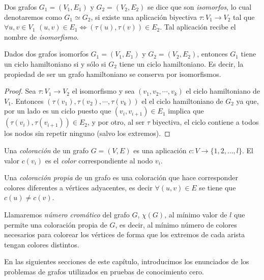 \begin{definition}
	Dos grafos $G_1 = (V_1, E_1)$ y $G_2 = (V_2, E_2)$ se dice que son \textit{isomorfos},
	lo cual denotaremos como $G_1 \simeq G_2$, si existe una aplicación biyectiva
	$\tau : V_1 \rightarrow V_2$ tal que $\forall u,v \in V_1$
	$(u,v) \in E_1 \Leftrightarrow (\tau(u), \tau(v)) \in E_2 $.
	Tal aplicación recibe el nombre de \textit{isomorfismo}.
\end{definition}

\begin{proposition}
Dados dos grafos isomorfos $G_1 = (V_1,E_1)$ y $G_2 = (V_2,E_2)$, entonces $G_1$
tiene un ciclo hamiltoniano si y s\'olo si $G_2$ tiene un ciclo hamiltoniano. Es
decir, la propiedad de ser un grafo hamiltoniano se conserva por isomorfismos.
\end{proposition}
\begin{proof}
Sea $\tau : V_1 \to V_2$ el isomorfismo y sea $(v_1,v_2,\cdots,v_k)$ el ciclo
hamiltoniano de $V_1$. Entonces $(\tau(v_1),\tau(v_2),\cdots,\tau(v_k))$ el el
ciclo hamiltoniano de $G_2$ ya que, por un lado es un ciclo puesto que
$(v_i,v_{i+1}) \in E_1$ implica que $(\tau(v_i),\tau(v_{i+1}))\in E_2$,
y por otro, al ser $\tau$ biyectiva, el ciclo contiene a todos los nodos
sin repetir ninguno (salvo los extremos).
\end{proof}

\begin{definition}
	Una \textit{coloración} de un grafo $G=(V,E)$ es una aplicación $c:V\rightarrow
	\{1,2,\dots , l\}$. El valor $c(v_i)$ es el \textit{color} correspondiente al
	nodo $v_i$.
\end{definition}

\begin{definition}
	Una \textit{coloración propia} de un grafo es una coloración que hace corresponder
	colores diferentes a vértices adyacentes, es decir
	$\forall (u,v)\in E$ se tiene que $c(u)\neq c(v)$.
\end{definition}


\begin{definition}
	Llamaremos \textit{número cromático} del grafo $G$, $\chi(G)$, al mínimo valor
	de $l$ que permite una coloración propia de $G$, es decir, al mínimo número de
	colores necesarios para colorear los vértices de forma que los extremos de cada
	arista tengan colores distintos.
\end{definition}

En las siguientes secciones de este cap\'itulo,
introducimos los enunciados de los problemas de grafos
utilizados en pruebas de conocimiento cero.

